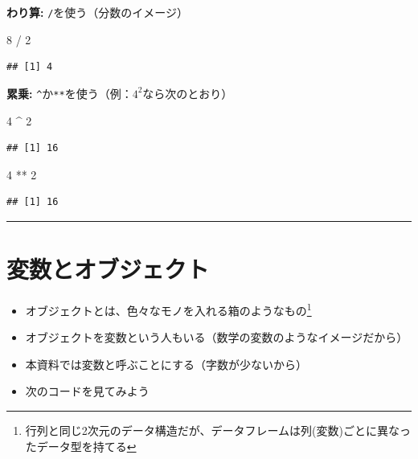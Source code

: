 \documentclass[
]{book}
\newenvironment{Shaded}{\begin{snugshade}}{\end{snugshade}}
\newcommand{\DecValTok}[1]{\textcolor[rgb]{0.00,0.00,0.81}{#1}}
\newcommand{\SpecialCharTok}[1]{\textcolor[rgb]{0.00,0.00,0.00}{#1}}
\begin{document}
\textbf{わり算:} \texttt{/}を使う（分数のイメージ）

\begin{Shaded}
\begin{Highlighting}[]
\DecValTok{8} \SpecialCharTok{/} \DecValTok{2}
\end{Highlighting}
\end{Shaded}

\begin{verbatim}
## [1] 4
\end{verbatim}

\textbf{累乗:} \texttt{\^{}}か\texttt{**}を使う（例：\(4^2\)なら次のとおり）

\begin{Shaded}
\begin{Highlighting}[]
\DecValTok{4} \SpecialCharTok{\^{}} \DecValTok{2}
\end{Highlighting}
\end{Shaded}

\begin{verbatim}
## [1] 16
\end{verbatim}

\begin{Shaded}
\begin{Highlighting}[]
\DecValTok{4} \SpecialCharTok{**} \DecValTok{2}
\end{Highlighting}
\end{Shaded}

\begin{verbatim}
## [1] 16
\end{verbatim}

\begin{center}\rule{0.5\linewidth}{0.5pt}\end{center}

\hypertarget{ux5909ux6570ux3068ux30aaux30d6ux30b8ux30a7ux30afux30c8}{%
\section{変数とオブジェクト}\label{ux5909ux6570ux3068ux30aaux30d6ux30b8ux30a7ux30afux30c8}}

\begin{itemize}
\item
  オブジェクトとは、色々なモノを入れる箱のようなもの\footnote{行列と同じ2次元のデータ構造だが、データフレームは列(変数)ごとに異なったデータ型を持てる}\\
\item
  オブジェクトを変数という人もいる（数学の変数のようなイメージだから）
\item
  本資料では変数と呼ぶことにする（字数が少ないから）
\item
  次のコードを見てみよう
\end{itemize}
\end{document}
